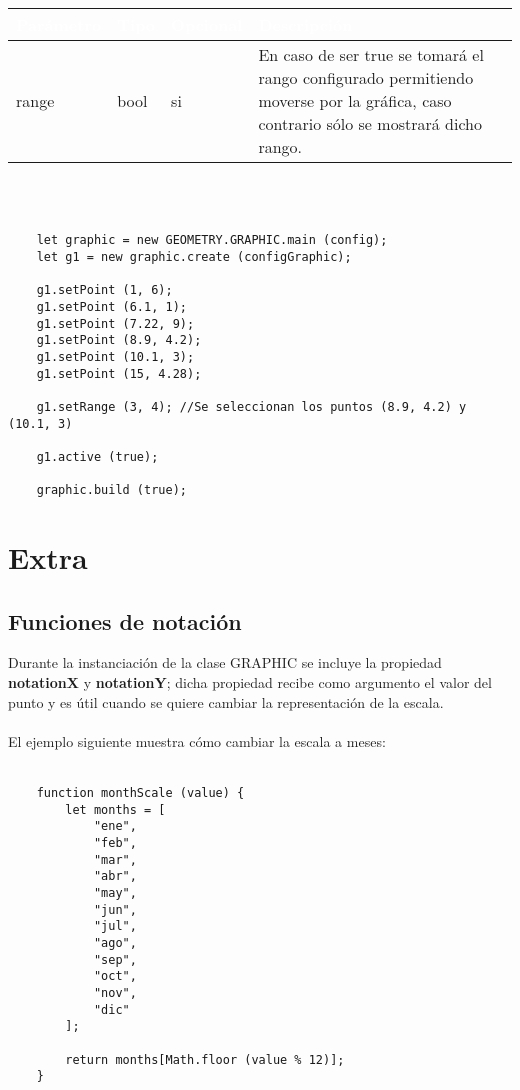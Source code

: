 \documentclass[10pt]{article}
\begin{document}
\\\\
\begin{tabular}{|m{2.2cm}|m{1.5cm}|m{1.5cm}|m{10cm}|}
	\hline
	\rowcolor{black}\textcolor{white}{Parámetro} & \textcolor{white}{Tipo} & \textcolor{white}{Opcional} & \textcolor{white}{Descripción} \\
	\hline
	range & bool & si & En caso de ser true se tomará el rango configurado permitiendo moverse por la gráfica, caso contrario sólo se mostrará dicho rango. \\
	\hline
\end{tabular}
\\\\
\begin{lstlisting}
	let graphic = new GEOMETRY.GRAPHIC.main (config);
	let g1 = new graphic.create (configGraphic);
	
	g1.setPoint (1, 6);
	g1.setPoint (6.1, 1);
	g1.setPoint (7.22, 9);
	g1.setPoint (8.9, 4.2);
	g1.setPoint (10.1, 3);
	g1.setPoint (15, 4.28);
	
	g1.setRange (3, 4); //Se seleccionan los puntos (8.9, 4.2) y (10.1, 3)
	
	g1.active (true);
	
	graphic.build (true);
\end{lstlisting}

\section{Extra}

\subsection{Funciones de notación}

Durante la instanciación de la clase GRAPHIC se incluye la propiedad \textbf{notationX} y \textbf{notationY}; dicha propiedad recibe como argumento el valor del punto y es útil cuando se quiere cambiar la representación de la escala.
\\\\
El ejemplo siguiente muestra cómo cambiar la escala a meses:
\\\\
\begin{lstlisting}
	function monthScale (value) {
		let months = [
			"ene",
			"feb",
			"mar",
			"abr",
			"may",
			"jun",
			"jul",
			"ago",
			"sep",
			"oct",
			"nov",
			"dic"
		];

        return months[Math.floor (value % 12)];
	}
\end{lstlisting}
\end{document}
